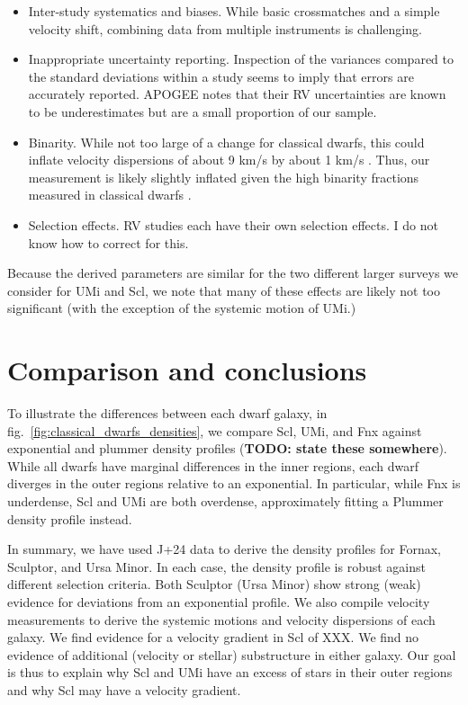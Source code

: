 \begin{itemize}
\tightlist
\item
  Inter-study systematics and biases. While basic crossmatches and a
  simple velocity shift, combining data from multiple instruments is
  challenging.
\item
  Inappropriate uncertainty reporting. Inspection of the variances
  compared to the standard deviations within a study seems to imply that
  errors are accurately reported. APOGEE notes that their RV
  uncertainties are known to be underestimates but are a small
  proportion of our sample.
\item
  Binarity. While not too large of a change for classical dwarfs, this
  could inflate velocity dispersions of about 9 km/s by about 1 km/s
  \citet{spencer+2017}. Thus, our measurement is likely slightly
  inflated given the high binarity fractions measured in classical
  dwarfs \citep[\citet{spencer+2018}]{arroyo-polonio+2023}.
\item
  Selection effects. RV studies each have their own selection effects. I
  do not know how to correct for this.
\end{itemize}

Because the derived parameters are similar for the two different larger
surveys we consider for UMi and Scl, we note that many of these effects
are likely not too significant (with the exception of the systemic
motion of UMi.)

\section{Comparison and conclusions}\label{comparison-and-conclusions}

To illustrate the differences between each dwarf galaxy, in
fig.~\ref{fig:classical_dwarfs_densities}, we compare Scl, UMi, and Fnx
against exponential and plummer density profiles (\textbf{TODO: state
these somewhere}). While all dwarfs have marginal differences in the
inner regions, each dwarf diverges in the outer regions relative to an
exponential. In particular, while Fnx is underdense, Scl and UMi are
both overdense, approximately fitting a Plummer density profile instead.

In summary, we have used J+24 data to derive the density profiles for
Fornax, Sculptor, and Ursa Minor. In each case, the density profile is
robust against different selection criteria. Both Sculptor (Ursa Minor)
show strong (weak) evidence for deviations from an exponential profile.
We also compile velocity measurements to derive the systemic motions and
velocity dispersions of each galaxy. We find evidence for a velocity
gradient in Scl of XXX. We find no evidence of additional (velocity or
stellar) substructure in either galaxy. Our goal is thus to explain why
Scl and UMi have an excess of stars in their outer regions and why Scl
may have a velocity gradient.

